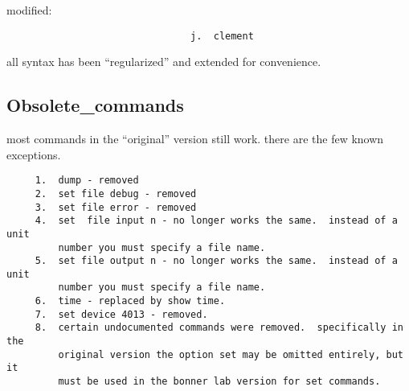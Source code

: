 modified:  
\begin{verbatim}
                                j.  clement
\end{verbatim}
all syntax has been ``regularized'' and extended for convenience.  
\subsection{Obsolete\_commands}
most  commands  in  the ``original'' version still work.  there are the few
known exceptions.  
\begin{verbatim}
     1.  dump - removed 
     2.  set file debug - removed 
     3.  set file error - removed 
     4.  set  file input n - no longer works the same.  instead of a unit
         number you must specify a file name.  
     5.  set file output n - no longer works the same.  instead of a unit
         number you must specify a file name.  
     6.  time - replaced by show time.  
     7.  set device 4013 - removed.  
     8.  certain undocumented commands were removed.  specifically in the
         original version the option set may be omitted entirely, but  it
         must be used in the bonner lab version for set commands.  
\end{verbatim}
